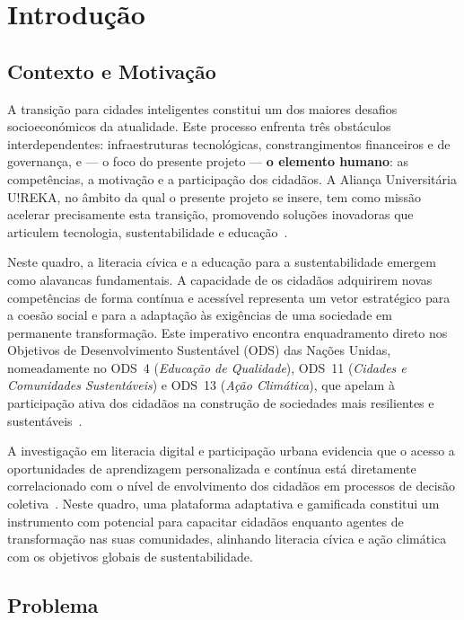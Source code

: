 %
%
\chapter{Introdução}
\label{cha:introducao}

\section{Contexto e Motivação}
\label{sec:contexto}

A transição para cidades inteligentes constitui um dos maiores desafios socioeconómicos da atualidade. Este processo enfrenta três obstáculos interdependentes: infraestruturas tecnológicas, constrangimentos financeiros e de governança, e --- o foco do presente projeto --- \textbf{o elemento humano}: as competências, a motivação e a participação dos cidadãos. A Aliança Universitária U!REKA, no âmbito da qual o presente projeto se insere, tem como missão acelerar precisamente esta transição, promovendo soluções inovadoras que articulem tecnologia, sustentabilidade e educação~\cite{ureka2024}.

Neste quadro, a literacia cívica e a educação para a sustentabilidade emergem como alavancas fundamentais. A capacidade de os cidadãos adquirirem novas competências de forma contínua e acessível representa um vetor estratégico para a coesão social e para a adaptação às exigências de uma sociedade em permanente transformação. Este imperativo encontra enquadramento direto nos Objetivos de Desenvolvimento Sustentável (ODS) das Nações Unidas, nomeadamente no ODS~4 (\textit{Educação de Qualidade}), ODS~11 (\textit{Cidades e Comunidades Sustentáveis}) e ODS~13 (\textit{Ação Climática}), que apelam à participação ativa dos cidadãos na construção de sociedades mais resilientes e sustentáveis~\cite{un2015sdg}.

A investigação em literacia digital e participação urbana evidencia que o acesso a oportunidades de aprendizagem personalizada e contínua está diretamente correlacionado com o nível de envolvimento dos cidadãos em processos de decisão coletiva~\cite{neirotti2014current}. Neste quadro, uma plataforma adaptativa e gamificada constitui um instrumento com potencial para capacitar cidadãos enquanto agentes de transformação nas suas comunidades, alinhando literacia cívica e ação climática com os objetivos globais de sustentabilidade.

\section{Problema}
\label{sec:problema}

